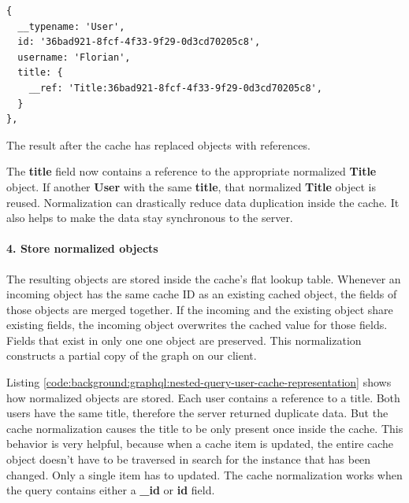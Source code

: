 \ifshowListings
\begin{listing}[H]
    \begin{verbatim}
{
  __typename: 'User',
  id: '36bad921-8fcf-4f33-9f29-0d3cd70205c8',
  username: 'Florian',
  title: {
    __ref: 'Title:36bad921-8fcf-4f33-9f29-0d3cd70205c8',
  }
},
    \end{verbatim}
    \caption{The result after the cache has replaced objects with references.}\label{code:background:graphql:nested-query-response-after-replacement}
\end{listing}
\fi

\noindent The \textbf{title} field now contains a reference to the appropriate normalized \textbf{Title} object. If another \textbf{User} with the same \textbf{title}, that normalized \textbf{Title} object is reused. Normalization can drastically reduce data duplication inside the cache. It also helps to make the data stay synchronous to the server.

\paragraph{4. Store normalized objects}\label{paragraph:background:graphql:apollo-server-client:data-normalization:store-normalized-objects}

The resulting objects are stored inside the cache's flat lookup table. Whenever an incoming object has the same cache ID as an existing cached object, the fields of those objects are merged together. If the incoming and the existing object share existing fields, the incoming object overwrites the cached value for those fields. Fields that exist in only one one object are preserved. This normalization constructs a partial copy of the graph on our client. \cite{misc:-:background:graphql:apollo-client-cache-overview}

\bigskip

\noindent Listing \ref{code:background:graphql:nested-query-user-cache-representation} shows how normalized objects are stored. Each user contains a reference to a title. Both users have the same title, therefore the server returned duplicate data. But the cache normalization causes the title to be only present once inside the cache. This behavior is very helpful, because when a cache item is updated, the entire cache object doesn't have to be traversed in search for the instance that has been changed. Only a single item has to updated. The cache normalization works when the query contains either a \textbf{\_id} or \textbf{id} field.

